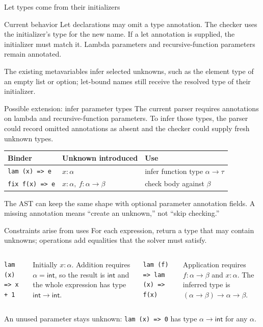\documentclass[aspectratio=169,11pt]{beamer}
\newcommand{\Int}{\mathsf{int}}
\begin{document}
\begin{frame}{Let types come from their initializers}
\begin{alertblock}{Current behavior}
Let declarations may omit a type annotation. The checker uses the initializer's
type for the new name. If a let annotation is supplied, the initializer must
match it. Lambda parameters and recursive-function parameters remain annotated.
\end{alertblock}
\medskip
The existing metavariables infer selected unknowns, such as the element type
of an empty list or option; let-bound names still receive the resolved type of
their initializer.
\end{frame}

\begin{frame}{Possible extension: infer parameter types}
The current parser requires annotations on lambda and recursive-function
parameters. To infer those types, the parser could record omitted annotations
as absent and the checker could supply fresh unknown types.
\begin{center}
\begin{tabular}{lll}
\textbf{Binder} & \textbf{Unknown introduced} & \textbf{Use} \\
\hline
\texttt{lam (x) => e} & $x:\alpha$ & infer function type $\alpha\to\tau$ \\
\texttt{fix f(x) => e} & $x:\alpha,\ f:\alpha\to\beta$ & check body against $\beta$ \\
\end{tabular}
\end{center}
The AST can keep the same shape with optional parameter annotation fields. A
missing annotation means ``create an unknown,'' not ``skip checking.''
\end{frame}

\begin{frame}[fragile]{Constraints arise from uses}
For each expression, return a type that may contain unknowns; operations add
equalities that the solver must satisfy.
\begin{columns}[T]
\begin{lstlisting}
lam (x) => x + 1
\end{lstlisting}
Initially $x:\alpha$. Addition requires $\alpha=\Int$, so the result is
$\Int$ and the whole expression has type $\Int\to\Int$.
\begin{lstlisting}
lam (f) => lam (x) => f(x)
\end{lstlisting}
Application requires $f:\alpha\to\beta$ and $x:\alpha$. The inferred type
is $(\alpha\to\beta)\to\alpha\to\beta$.
\end{columns}
\medskip
An unused parameter stays unknown: \texttt{lam (x) => 0} has type
$\alpha\to\Int$ for any $\alpha$.
\end{frame}
\end{document}
